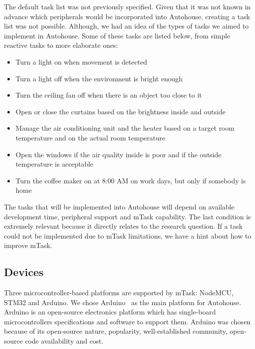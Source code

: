 The default task list was not previously specified. Given that it was not known in advance which peripherals would be incorporated into Autohouse, creating a task list was not possible. Although, we had an idea of the types of tasks we aimed to implement in Autohouse. Some of these tasks are listed below, from simple reactive tasks to more elaborate ones:

\begin{itemize}
    \item Turn a light on when movement is detected
    \item Turn a light off when the environment is bright enough
    \item Turn the ceiling fan off when there is an object too close to it
    \item Open or close the curtains based on the brightness inside and outside
    \item Manage the air conditioning unit and the heater based on a target room temperature and on the actual room temperature
    \item Open the windows if the air quality inside is poor and if the outside temperature is acceptable
    \item Turn the coffee maker on at 8:00 AM on work days, but only if somebody is home
\end{itemize}

The tasks that will be implemented into Autohouse will depend on available development time, peripheral support and mTask capability. The last condition is extremely relevant because it directly relates to the research question. If a task could not be implemented due to mTask limitations, we have a hint about how to improve mTask.

\subsection{Devices}\label{sec:autohouse_devices}

Three microcontroller-based platforms are supported by mTask: NodeMCU, STM32 and Arduino. We chose Arduino~\cite{arduino} as the main platform for Autohouse. Arduino is an open-source electronics platform which has single-board microcontrollers specifications and software to support them. Arduino was chosen because of its open-source nature, popularity, well-established community, open-source code availability and cost.

